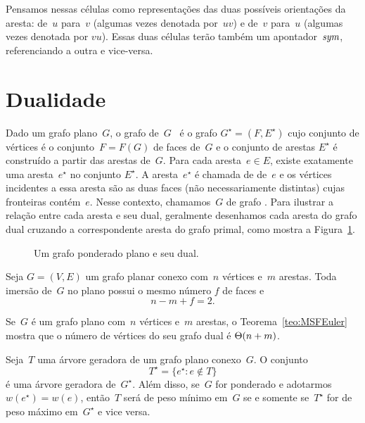 Pensamos nessas células como representações das duas possíveis orientações da aresta: de~$u$ para~$v$ (algumas vezes denotada por~$uv$) e de~$v$ para~$u$ (algumas vezes denotada por $vu$).
Essas duas células terão também um apontador~$\textit{sym}$, referenciando a outra e vice-versa.

\section{Dualidade}
\label{sec:dualidade}


Dado um grafo plano~$G$, o grafo  de~$G$~\cite{Diestel} é o grafo $G^\star = (F,E^\star)$ cujo conjunto de vértices é o conjunto~$F = F(G)$ de faces de~$G$ e o conjunto de arestas $E^\star$ é construído a partir das arestas de~$G$.
Para cada aresta~$e\in E$, existe exatamente uma aresta~$e^\star$ no conjunto $E^\star$.
A aresta~$e^\star$ é chamada de  de~$e$ e os vértices incidentes a essa aresta são as duas faces (não necessariamente distintas) cujas fronteiras contém~$e$.
Nesse contexto, chamamos~$G$ de grafo .
Para ilustrar a relação entre cada aresta e seu dual, geralmente desenhamos cada aresta do grafo dual cruzando a correspondente aresta do grafo primal, como mostra a Figura~\ref{fig:MSF-basico-1}.

\begin{figure}[htb]
\scalebox{1.5}{
\centering

}
\caption{Um grafo ponderado plano e seu dual.}
\label{fig:MSF-basico-1}
\end{figure}

\begin{theorem}
\label{teo:MSFEuler}
Seja $G=(V,E)$ um grafo planar conexo com~$n$ vértices e~$m$ arestas. Toda imersão de~$G$ no plano possui o mesmo número $f$ de faces e
$$
n-m+f = 2.
$$
\end{theorem}


Se~$G$ é um grafo plano com~$n$ vértices e~$m$ arestas, o Teorema~\ref{teo:MSFEuler} mostra que o número de vértices do seu grafo dual é $\Theta(n+m)$.

\begin{theorem}
\label{teo:MSFdual}
Seja~$T$ uma árvore geradora de um grafo plano conexo~$G$. O conjunto
$$
T^\star = \{e^\star:e\notin T\}
$$
é uma árvore geradora de~$G^\star$.
Além disso, se~$G$ for ponderado e adotarmos $w(e^\star) = w(e)$, então~$T$ será de peso mínimo em~$G$ se e somente se~$T^\star$ for de peso máximo em~$G^\star$ e vice versa.
\end{theorem}

